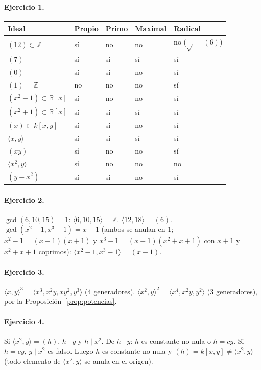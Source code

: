 \documentclass[11pt,a4paper]{article}
\newcommand{\ZZ}{\mathbb{Z}}
\newcommand{\RR}{\mathbb{R}}
\newcommand{\gen}[1]{\langle #1\rangle}
\theoremstyle{plain}
\theoremstyle{definition}
\theoremstyle{remark}
\begin{document}
\paragraph{Ejercicio 1.}
\begin{center}
\small
\begin{tabular}{@{}lllll@{}}
\toprule
Ideal & Propio & Primo & Maximal & Radical \\
\midrule
$(12)\subset\ZZ$ & sí & no & no & no ($\sqrt{}=(6)$) \\
$(7)$ & sí & sí & sí & sí \\
$(0)$ & sí & sí & no & sí \\
$(1)=\ZZ$ & no & no & no & sí \\
$(x^2-1)\subset\RR[x]$ & sí & no & no & sí \\
$(x^2+1)\subset\RR[x]$ & sí & sí & sí & sí \\
$(x)\subset k[x,y]$ & sí & sí & no & sí \\
$\gen{x,y}$ & sí & sí & sí & sí \\
$(xy)$ & sí & no & no & sí \\
$\gen{x^2,y}$ & sí & no & no & no \\
$(y-x^2)$ & sí & sí & no & sí \\
\bottomrule
\end{tabular}
\end{center}

\paragraph{Ejercicio 2.} $\gcd(6,10,15)=1$: $\gen{6,10,15}=\ZZ$. $\gen{12,18}=(6)$. $\gcd(x^2-1,x^3-1)=x-1$ (ambos se anulan en $1$; $x^2-1=(x-1)(x+1)$ y $x^3-1=(x-1)(x^2+x+1)$ con $x+1$ y $x^2+x+1$ coprimos): $\gen{x^2-1,x^3-1}=(x-1)$.

\paragraph{Ejercicio 3.} $\gen{x,y}^3=\gen{x^3,x^2y,xy^2,y^3}$ (4 generadores). $\gen{x^2,y}^2=\gen{x^4,x^2y,y^2}$ (3 generadores), por la Proposición~\ref{prop:potencias}.

\paragraph{Ejercicio 4.} Si $\gen{x^2,y}=(h)$, $h\mid y$ y $h\mid x^2$. De $h\mid y$: $h$ es constante no nula o $h=cy$. Si $h=cy$, $y\mid x^2$ es falso. Luego $h$ es constante no nula y $(h)=k[x,y]\ne\gen{x^2,y}$ (todo elemento de $\gen{x^2,y}$ se anula en el origen).
\end{document}
